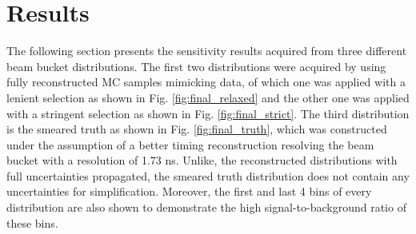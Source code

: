 \section{Results}
\label{sec:result}

The following section presents the sensitivity results acquired from three different beam bucket distributions.
The first two distributions were acquired by using fully reconstructed MC samples mimicking data, of which one 
was applied with a lenient selection as shown in Fig. \ref{fig:final_relaxed} and the other one was applied with a stringent selection as shown in Fig. \ref{fig:final_strict}.
The third distribution is the smeared truth as shown in Fig. \ref{fig:final_truth}, which was constructed under the assumption of a better timing reconstruction resolving the beam bucket with a resolution of 1.73 ns.
Unlike, the reconstructed distributions with full uncertainties propagated, the smeared truth distribution does not contain any uncertainties for simplification. 
Moreover, the first and last 4 bins of every distribution are also shown to demonstrate the high signal-to-background ratio of these bins.

